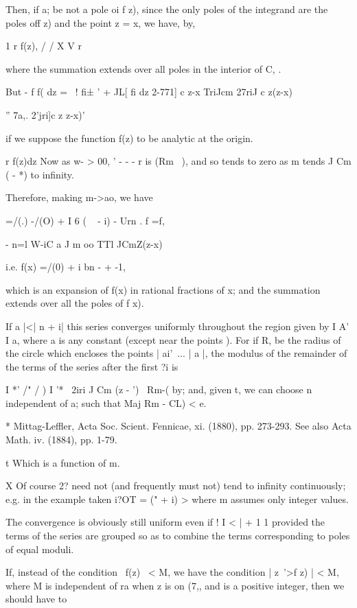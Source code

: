 Then, if a; be not a pole oi f z), since the only poles of the
integrand are the poles off z) and the point z = x, we have, by,

1 r f(z), / / X V r

where the summation extends over all poles in the interior of C, .

But - f f( dz = ~! fi± ' + JL[ fi dz 2-771] c z-x TriJcm 27riJ c
z(z-x)

  '' 7a,. 2'jri]c z z-x)'

if we suppose the function f(z) to be analytic at the origin.

r f(z)dz Now as w- > 00, ' - - - r is (Rm~ ), and so tends to zero as
m tends J Cm ( - *) to infinity.

Therefore, making m->ao, we have

=/(.) -/(O) + I 6 ( ~ - i) - Urn . f =f,

- n=l W-iC a J m oo TTl JCmZ(z-x)

i.e. f(x) =/(0) + i bn - + -1,

which is an expansion of f(x) in rational fractions of x; and the
summation extends over all the poles of f x).

If a |<| n + i| this series converges uniformly throughout the region
given by I A' I a, where a is any constant (except near the points ).
For if R, be the radius of the circle which encloses the points |
ai'\, ... | a |, the modulus of the remainder of the terms of the
series after the first ?i is

I *' /" / ) I  '* \ 2iri J Cm (z - ') \ Rm-( by; and, given
t, we can choose n independent of a; such that Maj Rm - CL) < e.

* Mittag-Leffler, Acta Soc. Scient. Fennicae, xi. (1880), pp. 273-293.
See also Acta Math. iv. (1884), pp. 1-79.

t Which is a function of m.

X Of course 2? need not (and frequently must not) tend to infinity
continuously; e.g. in the example taken i?OT = (" + i) > where m
assumes only integer values.
%
%

The convergence is obviously still uniform even if ! I < | + 1 1
provided the terms of the series are grouped so as to combine the
terms corresponding to poles of equal moduli.

If, instead of the condition \ f(z) \ < M, we have the condition |
z~'>f z) | < M, where M is independent of ra when z is on (7,, and is
a positive integer, then we should have to

